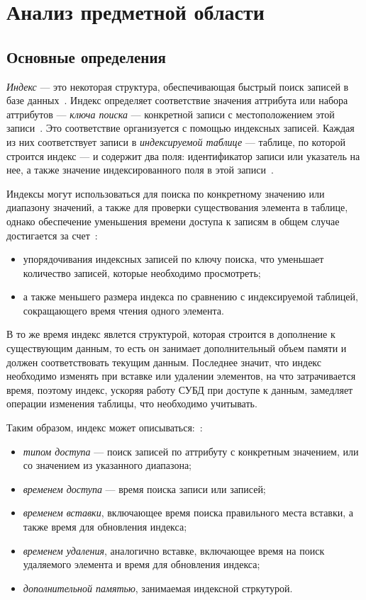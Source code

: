 \chapter{Анализ предметной области}

\section{Основные определения}

\textit{Индекс} --- это некоторая структура, обеспечивающая быстрый поиск
записей в базе данных~\cite{amur}. Индекс определяет соответствие значения
аттрибута или набора аттрибутов --- \textit{ключа поиска} --- конкретной
записи с местоположением этой записи~\cite{ship}. Это соответствие организуется
с помощью индексных записей. Каждая из них соответствует записи в
\textit{индексируемой таблице} --- таблице, по которой строится индекс --- и
содержит два поля: идентификатор записи или указатель на нее, а также значение
индексированного поля в этой записи~\cite{syore}.

Индексы могут использоваться для поиска по конкретному значению или диапазону
значений, а также для проверки существования элемента в таблице, однако
обеспечение уменьшения времени доступа к записям в общем случае достигается за
счет~\cite{ship}:
\begin{itemize}
    \item упорядочивания индексных записей по ключу поиска, что уменьшает
        количество записей, которые необходимо просмотреть;
    \item а также меньшего размера индекса по сравнению с индексируемой
        таблицей, сокращающего время чтения одного элемента.
\end{itemize}

В то же время индекс явлется структурой, которая строится в дополнение к
существующим данным, то есть он занимает дополнительный объем памяти и должен
соответствовать текущим данным.  Последнее значит, что индекс необходимо
изменять при вставке или удалении элементов, на что затрачивается время, поэтому
индекс, ускоряя работу СУБД при доступе к данным, замедляет операции изменения
таблицы, что необходимо учитывать\cite{osip}.

Таким образом, индекс может описываться:~\cite{ship}:
\begin{itemize}
    \item \textit{типом доступа} --- поиск записей по аттрибуту с конкретным
        значением, или со значением из указанного диапазона;
    \item \textit{временем доступа} --- время поиска записи или записей;
    \item \textit{временем вставки}, включающее время поиска правильного места вставки, а
        также время для обновления индекса;
    \item \textit{временем удаления}, аналогично вставке, включающее время на поиск
        удаляемого элемента и время для обновления индекса;
    \item \textit{дополнительной памятью}, занимаемая индексной стркутурой.
\end{itemize}

